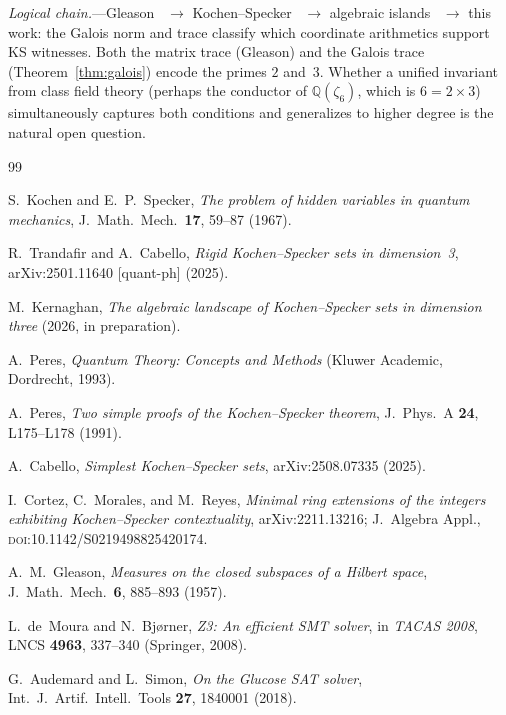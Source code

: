\documentclass[12pt,a4paper]{article}
\newcommand{\Q}{\mathbb{Q}}
\begin{document}
\textit{Logical chain.}---Gleason~\cite{Gleason1957} $\to$
Kochen--Specker~\cite{KochenSpecker1967} $\to$
algebraic islands~\cite{Kernaghan2026islands} $\to$ this work: the
Galois norm and trace classify which coordinate arithmetics support
KS witnesses.  Both the matrix trace (Gleason) and the Galois trace
(Theorem~\ref{thm:galois}) encode the primes $2$ and~$3$.  Whether a
unified invariant from class field theory (perhaps the conductor of
$\Q(\zeta_6)$, which is $6 = 2 \times 3$) simultaneously captures
both conditions and generalizes to higher degree is the natural open
question.

\begin{thebibliography}{99}

S.~Kochen and E.~P.~Specker,
\textit{The problem of hidden variables in quantum mechanics},
J.~Math.\ Mech.\ \textbf{17}, 59--87 (1967).

R.~Trandafir and A.~Cabello,
\textit{Rigid Kochen--Specker sets in dimension~3},
arXiv:2501.11640 [quant-ph] (2025).

M.~Kernaghan,
\textit{The algebraic landscape of Kochen--Specker sets in dimension
three} (2026, in preparation).

A.~Peres,
\textit{Quantum Theory: Concepts and Methods}
(Kluwer Academic, Dordrecht, 1993).

A.~Peres,
\textit{Two simple proofs of the Kochen--Specker theorem},
J.~Phys.~A \textbf{24}, L175--L178 (1991).

A.~Cabello,
\textit{Simplest Kochen--Specker sets},
arXiv:2508.07335 (2025).

I.~Cortez, C.~Morales, and M.~Reyes,
\textit{Minimal ring extensions of the integers exhibiting Kochen--Specker contextuality},
arXiv:2211.13216; J.\ Algebra Appl., \textsc{doi}:10.1142/S0219498825420174.

A.~M.~Gleason,
\textit{Measures on the closed subspaces of a Hilbert space},
J.~Math.\ Mech.\ \textbf{6}, 885--893 (1957).

L.~de~Moura and N.~Bj{\o}rner,
\textit{Z3: An efficient SMT solver},
in \textit{TACAS 2008}, LNCS \textbf{4963}, 337--340 (Springer, 2008).

G.~Audemard and L.~Simon,
\textit{On the Glucose SAT solver},
Int.\ J.\ Artif.\ Intell.\ Tools \textbf{27}, 1840001 (2018).

\end{thebibliography}
\end{document}
